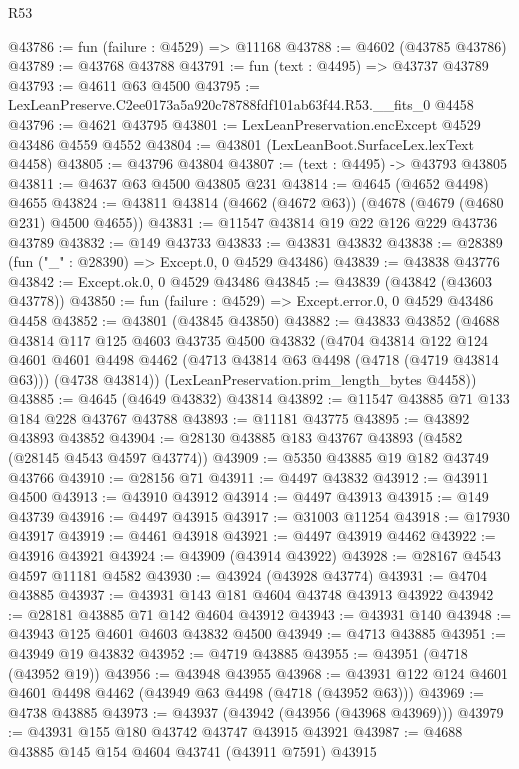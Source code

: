 \begin{lexlean}{R53}
\begin{coremodule}
@43786 := fun (failure : @4529) => @11168
@43788 := @4602 (@43785 @43786)
@43789 := @43768 @43788
@43791 := fun (text : @4495) => @43737 @43789
@43793 := @4611 @63 @4500
@43795 := LexLeanPreserve.C2ee0173a5a920c78788fdf101ab63f44.R53.__fits_0 @4458
@43796 := @4621 @43795
@43801 := LexLeanPreservation.encExcept @4529 @43486 @4559 @4552
@43804 := @43801 (LexLeanBoot.SurfaceLex.lexText @4458)
@43805 := @43796 @43804
@43807 := (text : @4495) -> @43793 @43805
@43811 := @4637 @63 @4500 @43805 @231
@43814 := @4645 (@4652 @4498) @4655
@43824 := @43811 @43814 (@4662 (@4672 @63)) (@4678 (@4679 (@4680 @231) @4500 @4655))
@43831 := @11547 @43814 @19 @22 @126 @229 @43736 @43789
@43832 := @149 @43733
@43833 := @43831 @43832
@43838 := @28389 (fun ("_" : @28390) => Except.{0, 0} @4529 @43486)
@43839 := @43838 @43776
@43842 := Except.ok.{0, 0} @4529 @43486
@43845 := @43839 (@43842 (@43603 @43778))
@43850 := fun (failure : @4529) => Except.error.{0, 0} @4529 @43486 @4458
@43852 := @43801 (@43845 @43850)
@43882 := @43833
    @43852
    (@4688
      @43814
      @117
      @125
      @4603
      @43735
      @4500
      @43832
      (@4704
        @43814
        @122
        @124
        @4601
        @4601
        @4498
        @4462
        (@4713 @43814 @63 @4498 (@4718 (@4719 @43814 @63)))
        (@4738 @43814))
      (LexLeanPreservation.prim_length_bytes @4458))
@43885 := @4645 (@4649 @43832) @43814
@43892 := @11547 @43885 @71 @133 @184 @228 @43767 @43788
@43893 := @11181 @43775
@43895 := @43892 @43893 @43852
@43904 := @28130 @43885 @183 @43767 @43893 (@4582 (@28145 @4543 @4597 @43774))
@43909 := @5350 @43885 @19 @182 @43749 @43766
@43910 := @28156 @71
@43911 := @4497 @43832
@43912 := @43911 @4500
@43913 := @43910 @43912
@43914 := @4497 @43913
@43915 := @149 @43739
@43916 := @4497 @43915
@43917 := @31003 @11254
@43918 := @17930 @43917
@43919 := @4461 @43918
@43921 := @4497 @43919 @4462
@43922 := @43916 @43921
@43924 := @43909 (@43914 @43922)
@43928 := @28167 @4543 @4597 @11181 @4582
@43930 := @43924 (@43928 @43774)
@43931 := @4704 @43885
@43937 := @43931 @143 @181 @4604 @43748 @43913 @43922
@43942 := @28181 @43885 @71 @142 @4604 @43912
@43943 := @43931 @140
@43948 := @43943 @125 @4601 @4603 @43832 @4500
@43949 := @4713 @43885
@43951 := @43949 @19 @43832
@43952 := @4719 @43885
@43955 := @43951 (@4718 (@43952 @19))
@43956 := @43948 @43955
@43968 := @43931 @122 @124 @4601 @4601 @4498 @4462 (@43949 @63 @4498 (@4718 (@43952 @63)))
@43969 := @4738 @43885
@43973 := @43937 (@43942 (@43956 (@43968 @43969)))
@43979 := @43931 @155 @180 @43742 @43747 @43915 @43921
@43987 := @4688 @43885 @145 @154 @4604 @43741 (@43911 @7591) @43915

\end{coremodule}
\end{lexlean}
